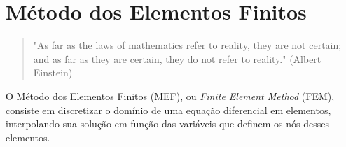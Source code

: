 \chapter{Método dos Elementos Finitos}

\begin{quote}
    "As far as the laws of mathematics refer to reality, they are not certain; and as far as they are certain, they do not refer to reality." (Albert Einstein)
\end{quote}

O Método dos Elementos Finitos (MEF), ou \textit{Finite Element Method} (FEM), consiste em discretizar o domínio de uma equação diferencial em elementos, interpolando sua solução em função das variáveis que definem os nós desses elementos.